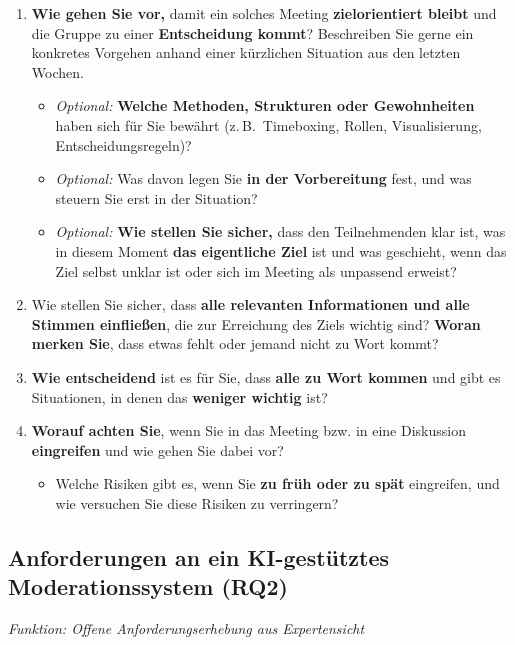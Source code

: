 \begin{enumerate}[label=3.\arabic*, leftmargin=*]
  \item \textbf{Wie gehen Sie vor,} damit ein solches Meeting \textbf{zielorientiert bleibt} und die Gruppe zu einer
    \textbf{Entscheidung kommt}? Beschreiben Sie gerne ein konkretes Vorgehen anhand einer
    kürzlichen Situation aus den letzten Wochen.
    \begin{itemize}[label=\textendash]
      \item \textit{Optional:} \textbf{Welche Methoden, Strukturen oder Gewohnheiten} haben sich
        für Sie bewährt (z.\,B.\ Timeboxing, Rollen, Visualisierung, Entscheidungsregeln)?
      \item \textit{Optional:} Was davon legen Sie \textbf{in der Vorbereitung} fest, und was
        steuern Sie erst in der Situation?
      \item \textit{Optional:} \textbf{Wie stellen Sie sicher,} dass den Teilnehmenden klar ist,
        was in diesem Moment \textbf{das eigentliche Ziel} ist und was geschieht, wenn das Ziel
        selbst unklar ist oder sich im Meeting als unpassend erweist?
    \end{itemize}
  \item Wie stellen Sie sicher, dass \textbf{alle relevanten Informationen und alle Stimmen einfließen},
    die zur Erreichung des Ziels wichtig sind? \textbf{Woran merken Sie}, dass etwas fehlt oder jemand
    nicht zu Wort kommt?
  \item \textbf{Wie entscheidend} ist es für Sie, dass \textbf{alle zu Wort kommen} und gibt es Situationen,
    in denen das \textbf{weniger wichtig} ist?
  \item \textbf{Worauf achten Sie}, wenn Sie in das Meeting bzw. in eine Diskussion \textbf{eingreifen} und
    wie gehen Sie dabei vor?
    \begin{itemize}[label=\textendash]
      \item Welche Risiken gibt es, wenn Sie \textbf{zu früh oder zu spät} eingreifen, und wie
        versuchen Sie diese Risiken zu verringern?
    \end{itemize}
\end{enumerate}

\clearpage
\subsection*{Anforderungen an ein KI-gestütztes Moderationssystem (RQ2)}
\textit{Funktion: Offene Anforderungserhebung aus Expertensicht}

